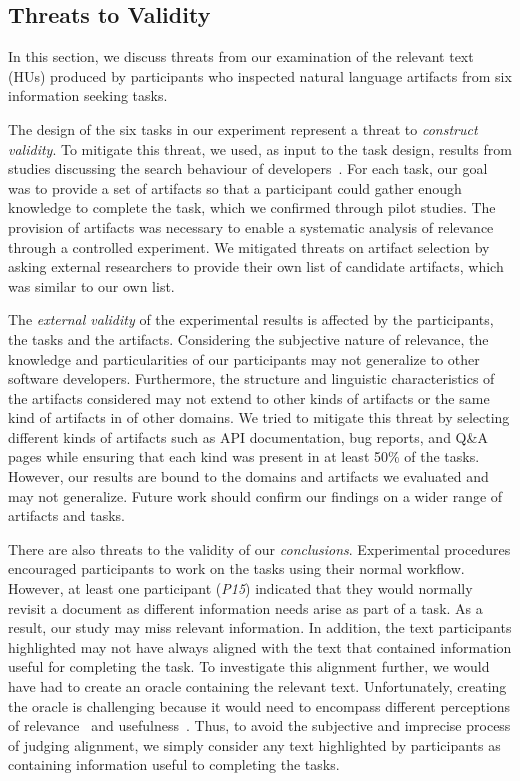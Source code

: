 
\subsection{Threats to Validity}
\label{cp3:threats}


In this section, we discuss threats from our 
examination of the relevant text (HUs) produced by participants who 
inspected natural language artifacts from six information seeking tasks. 



The design of the six tasks in our experiment represent a threat to
\textit{construct validity}.  To mitigate this threat, we used, as
input to the task design, results from studies discussing the search
behaviour of developers~\cite{umarji2008archetypal, Li2013, Xia2017}.
For each task, our goal was to provide a set of artifacts so that a
participant could gather enough knowledge to complete the task, which
we confirmed through pilot studies.  The provision of artifacts was
necessary to enable a systematic analysis of relevance through a
controlled experiment. We mitigated threats on artifact
selection by asking external researchers to provide their own list of
candidate artifacts, which was similar to our own list.



The \textit{external validity} of the experimental results is affected
by the participants, the tasks and the artifacts.  Considering the
subjective nature of relevance, the knowledge and particularities of
our participants may not generalize to other software developers.
Furthermore, the structure and linguistic characteristics of the
artifacts considered may not extend to other kinds of artifacts or the
same kind of artifacts in of other domains.  We tried to mitigate this
threat by selecting different kinds of artifacts such as API
documentation, bug reports, and Q\&A pages while 
ensuring that each kind was present in at least
50\% of the tasks. 
However, our results
are bound to the domains and artifacts we evaluated and may not generalize.
Future work should confirm our findings on a wider range of artifacts and tasks.


There are also threats to the validity of our
\textit{conclusions}.
Experimental procedures encouraged participants to work on the tasks using their normal workflow.
However, at least one participant (\textit{P15}) indicated that they would normally
revisit a document as different information needs arise as part of a task.
As a result, our study may miss relevant information.
In addition, the text participants highlighted may not have always aligned with the text that contained information useful for completing the task.
To investigate this alignment further, we would have had to create an oracle containing the relevant text.
Unfortunately, creating the oracle is challenging because it would need to encompass different perceptions of relevance~\cite{Pirolli1999,saracevic1975,Nenkova2004} and usefulness~\cite{Freund2013, Freund2015}.
Thus, to avoid the subjective and imprecise process of judging alignment, we simply consider any text highlighted by participants as containing information useful to completing the tasks.




